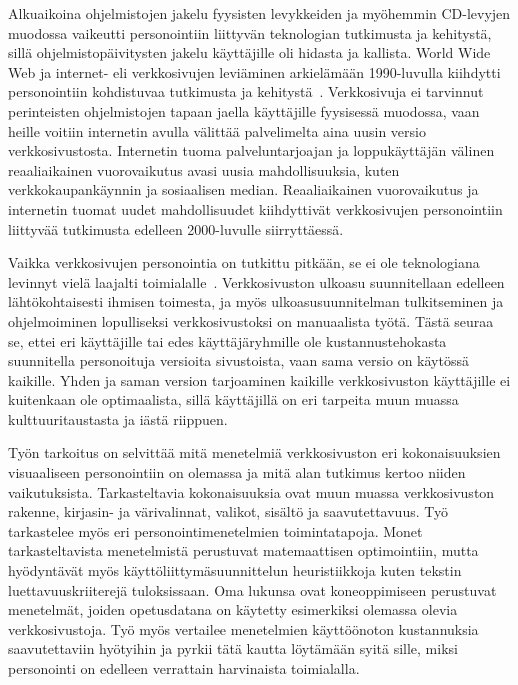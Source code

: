 \documentclass[finnish, 12pt, a4paper, elec, utf8, a-1b, online]{aaltothesis}
\begin{document}
Alkuaikoina ohjelmistojen jakelu fyysisten levykkeiden ja myöhemmin CD-levyjen
muodossa vaikeutti personointiin liittyvän teknologian tutkimusta ja kehitystä,
sillä ohjelmistopäivitysten jakelu käyttäjille oli hidasta ja kallista. World
Wide Web ja internet- eli verkkosivujen leviäminen arkielämään 1990-luvulla
kiihdytti personointiin kohdistuvaa tutkimusta ja
kehitystä~\cite{10.1108/03090560710737534}. Verkkosivuja ei tarvinnut
perinteisten ohjelmistojen tapaan jaella käyttäjille fyysisessä muodossa, vaan
heille voitiin internetin avulla välittää palvelimelta aina uusin versio
verkkosivustosta. Internetin tuoma palveluntarjoajan ja loppukäyttäjän välinen
reaaliaikainen vuorovaikutus avasi uusia mahdollisuuksia, kuten
verkkokaupankäynnin ja sosiaalisen median. Reaaliaikainen vuorovaikutus ja
internetin tuomat uudet mahdollisuudet kiihdyttivät verkkosivujen personointiin
liittyvää tutkimusta edelleen 2000-luvulle siirryttäessä.

Vaikka verkkosivujen personointia on tutkittu pitkään, se ei ole teknologiana
levinnyt vielä laajalti toimialalle~\cite{citation needed}. Verkkosivuston
ulkoasu suunnitellaan edelleen lähtökohtaisesti ihmisen toimesta, ja myös
ulkoasusuunnitelman tulkitseminen ja ohjelmoiminen lopulliseksi verkkosivustoksi
on manuaalista työtä. Tästä seuraa se, ettei eri käyttäjille tai edes
käyttäjäryhmille ole kustannustehokasta suunnitella personoituja versioita
sivustoista, vaan sama versio on käytössä kaikille. Yhden ja saman version
tarjoaminen kaikille verkkosivuston käyttäjille ei kuitenkaan ole optimaalista,
sillä käyttäjillä on eri tarpeita muun muassa kulttuuritaustasta ja iästä
riippuen.

Työn tarkoitus on selvittää mitä menetelmiä verkkosivuston eri kokonaisuuksien
visuaaliseen personointiin on olemassa ja mitä alan tutkimus kertoo niiden
vaikutuksista. Tarkasteltavia kokonaisuuksia ovat muun muassa verkkosivuston
rakenne, kirjasin- ja värivalinnat, valikot, sisältö ja saavutettavuus. Työ
tarkastelee myös eri personointimenetelmien toimintatapoja. Monet
tarkasteltavista menetelmistä perustuvat matemaattisen optimointiin, mutta
hyödyntävät myös käyttöliittymäsuunnittelun heuristiikkoja kuten tekstin
luettavuuskriiterejä tuloksissaan. Oma lukunsa ovat koneoppimiseen perustuvat
menetelmät, joiden opetusdatana on käytetty esimerkiksi olemassa olevia
verkkosivustoja. Työ myös vertailee menetelmien käyttöönoton kustannuksia
saavutettaviin hyötyihin ja pyrkii tätä kautta löytämään syitä sille, miksi
personointi on edelleen verrattain harvinaista toimialalla.
\end{document}
